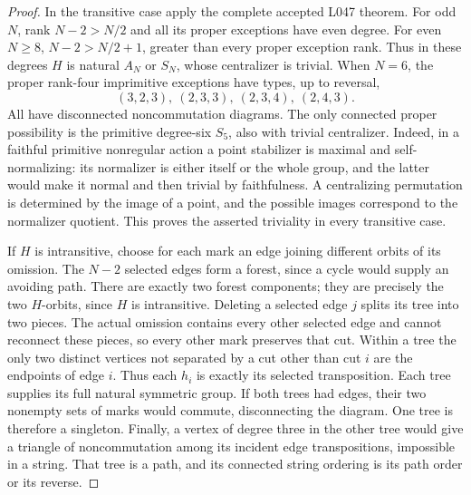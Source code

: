 \documentclass[11pt,a4paper]{article}
\begin{document}
\begin{proof}
In the transitive case apply the complete accepted L047 theorem.
For odd $N$, rank $N-2>N/2$ and all its proper exceptions
have even degree. For even $N\ge8$,
$N-2>N/2+1$, greater than every proper exception rank.
Thus in these degrees $H$ is natural $A_N$ or $S_N$,
whose centralizer is trivial. When $N=6$, the proper
rank-four imprimitive exceptions have types, up to reversal,
\[
 (3,2,3),\ (2,3,3),\ (2,3,4),\ (2,4,3).
\]
All have disconnected noncommutation diagrams. The only
connected proper possibility is the primitive degree-six
$S_5$, also with trivial centralizer. Indeed, in a faithful
primitive nonregular action a point stabilizer is maximal
and self-normalizing: its normalizer is either itself or
the whole group, and the latter would make it normal and
then trivial by faithfulness. A centralizing permutation
is determined by the image of a point, and the possible
images correspond to the normalizer quotient. This proves
the asserted triviality in every transitive case.

If $H$ is intransitive, choose for each mark an edge joining
different orbits of its omission. The $N-2$ selected edges
form a forest, since a cycle would supply an avoiding path.
There are exactly two forest components; they are precisely
the two $H$-orbits, since $H$ is intransitive.
Deleting a selected edge $j$ splits its tree into two pieces.
The actual omission contains every other selected edge and
cannot reconnect these pieces, so every other mark preserves
that cut. Within a tree the only two distinct vertices not
separated by a cut other than cut $i$ are the endpoints of
edge $i$. Thus each $h_i$ is exactly its selected
transposition. Each tree supplies its full natural symmetric
group. If both trees had edges, their two nonempty sets of
marks would commute, disconnecting the diagram. One tree
is therefore a singleton. Finally, a vertex of degree three
in the other tree would give a triangle of noncommutation
among its incident edge transpositions, impossible in a string.
That tree is a path, and its connected string ordering is
its path order or its reverse.
\end{proof}
\end{document}
